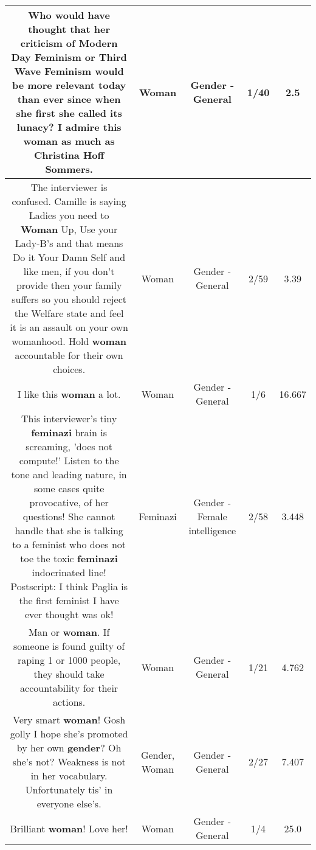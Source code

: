 \documentclass[11pt]{article}
\newlength\mylength
\begin{document}
\begin{center}
\begin{longtable}{|C{.65\mylength}|C{.30\mylength}|C{.12\mylength}|C{.12\mylength}|C{.12\mylength}|}
  \small Who would have thought that her criticism of Modern Day Feminism or Third Wave Feminism would be more relevant today than ever since when she first she called its lunacy? I admire this \textbf{woman} as much as Christina Hoff Sommers.\normalsize   & Woman & Gender - General & 1/40 & 2.5 \\  \hline
  \small The interviewer is confused. Camille is saying Ladies you need to \textbf{Woman} Up, Use your Lady-B's and that means Do it Your Damn Self and like men, if you don't provide then your family suffers so you should reject the Welfare state and feel it is an assault on your own womanhood. Hold \textbf{woman} accountable for their own choices.\normalsize   & Woman & Gender - General & 2/59 & 3.39 \\  \hline
  \small I like this \textbf{woman} a lot.\normalsize   & Woman & Gender - General & 1/6 & 16.667 \\  \hline
  \small This interviewer's tiny \textbf{feminazi} brain is screaming, 'does not compute!' Listen to the tone and leading nature, in some cases quite provocative, of her questions! She cannot handle that she is talking to a feminist who does not toe the toxic \textbf{feminazi} indocrinated  line!  Postscript: I think Paglia is the first feminist I have ever thought was ok!\normalsize   & Feminazi & Gender - Female intelligence & 2/58 & 3.448 \\  \hline
  \small Man or \textbf{woman}. If someone is found guilty of raping 1 or 1000 people, they should take accountability for their actions.\normalsize   & Woman & Gender - General & 1/21 & 4.762 \\  \hline
  \small Very smart \textbf{woman}! Gosh golly I hope she's promoted by her own \textbf{gender}? Oh she's not? Weakness is not in her vocabulary. Unfortunately  tis' in everyone else's.\normalsize   & Gender, Woman & Gender - General & 2/27 & 7.407 \\  \hline
  \small Brilliant \textbf{woman}! Love her!\normalsize   & Woman & Gender - General & 1/4 & 25.0 \\  \hline

\end{longtable}
\end{center}
\end{document}
